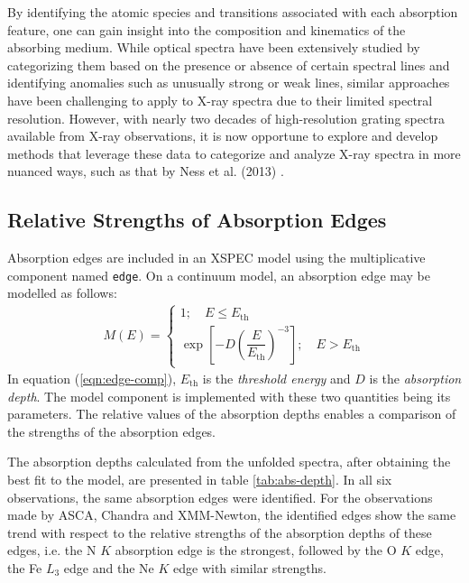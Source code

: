 		    By identifying the atomic species and transitions associated with each absorption feature, one can gain insight into the composition and kinematics of the absorbing medium. While optical spectra have been extensively studied by categorizing them based on the presence or absence of certain spectral lines and identifying anomalies such as unusually strong or weak lines, similar approaches have been challenging to apply to X-ray spectra due to their limited spectral resolution. However, with nearly two decades of high-resolution grating spectra available from X-ray observations, it is now opportune to explore and develop methods that leverage these data to categorize and analyze X-ray spectra in more nuanced ways, such as that by Ness et al. (2013) \cite{ness2013obscuration}.
    	
    	\subsection{Relative Strengths of Absorption Edges} \label{multi-obs:discussion:abs-edge-strength}
    		Absorption edges are included in an XSPEC model using the multiplicative component named \texttt{edge}. On a continuum model, an absorption edge may be modelled as follows:
		    \begin{align}
		    	M(E)=\begin{cases}
		    		{1;\quad E\leqslant E_\text{th}} \\
		    		{\exp{\left[ -D\left(\dfrac{E}{E_\text{th}}\right)^{-3} \right]};\quad E> E_\text{th}}
		    	\end{cases} \label{eqn:edge-comp}
		    \end{align}
		    In equation (\ref{eqn:edge-comp}), $E_\text{th}$ is the \textit{threshold energy} and $D$ is the \textit{absorption depth}. The model component is implemented with these two quantities being its parameters. The relative values of the absorption depths enables a comparison of the strengths of the absorption edges.
		    
		    The absorption depths calculated from the unfolded spectra, after obtaining the best fit to the model, are presented in table \ref{tab:abs-depth}. In all six observations, the same absorption edges were identified. For the observations made by ASCA, Chandra and XMM-Newton, the identified edges show the same trend with respect to the relative strengths of the absorption depths of these edges, i.e. the N $K$ absorption edge is the strongest, followed by the O $K$ edge, the Fe $L_3$ edge and the Ne $K$ edge with similar strengths.
		    
